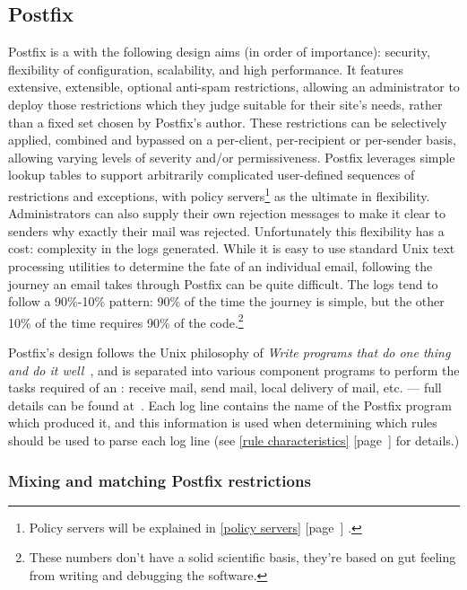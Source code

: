 \documentclass[a4paper,12pt,draft]{article}
\newcommand{\refwithpage}[1]{%
    \empty{}\ref{#1} [page~\pageref{#1}]%
}
\newcommand{\sectionref}[1]{%
    \textsection{}\refwithpage{#1}%
}
\begin{document}
\subsection{Postfix}

\label{postfix background}

Postfix is a \MTA{} with the following design aims (in order of
importance): security, flexibility of configuration, scalability, and high
performance.  It features extensive, extensible, optional anti-spam
restrictions, allowing an administrator to deploy those restrictions which
they judge suitable for their site's needs, rather than a fixed set chosen
by Postfix's author.  These restrictions can be selectively applied,
combined and bypassed on a per-client, per-recipient or per-sender basis,
allowing varying levels of severity and/or permissiveness.  Postfix
leverages simple lookup tables to support arbitrarily complicated
user-defined sequences of restrictions and exceptions, with policy
servers\footnote{Policy servers will be explained in \sectionref{policy
servers}.} as the ultimate in flexibility.  Administrators can also supply
their own rejection messages to make it clear to senders why exactly their
mail was rejected.  Unfortunately this flexibility has a cost: complexity
in the logs generated.  While it is easy to use standard Unix text
processing utilities to determine the fate of an individual email,
following the journey an email takes through Postfix can be quite
difficult.  The logs tend to follow a 90\%-10\% pattern: 90\% of the time
the journey is simple, but the other 10\% of the time requires 90\% of the
code.\footnote{These numbers don't have a solid scientific basis, they're
based on gut feeling from writing and debugging the software.}

Postfix's design follows the Unix philosophy of \textit{Write programs that
do one thing and do it well\/}~\cite{unix-philosophy}, and is separated
into various component programs to perform the tasks required of an
\MTA{}\@: receive mail, send mail, local delivery of mail, etc. --- full
details can be found at~\cite{postfix-overview}.  Each log line contains
the name of the Postfix program which produced it, and this information is
used when determining which rules should be used to parse each log line
(see \sectionref{rule characteristics} for details.)

\subsubsection{Mixing and matching Postfix restrictions}
\end{document}
